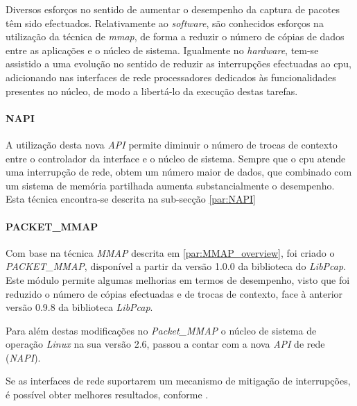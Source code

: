 Diversos esforços no sentido de aumentar o desempenho da captura de pacotes têm sido efectuados.
Relativamente ao \textit{software}, são conhecidos esforços na utilização da técnica de \textit{mmap}, de forma a reduzir o número de cópias de dados entre as aplicações e o núcleo de sistema.
Igualmente no \textit{hardware}, tem-se assistido a uma evolução no sentido de reduzir as interrupções efectuadas ao cpu, adicionando nas interfaces de rede processadores dedicados às funcionalidades presentes no núcleo, de modo a libertá-lo da execução destas tarefas.

\paragraph*{NAPI}

A utilização desta nova \textit{API} permite diminuir o número de trocas de contexto entre o controlador da interface e o núcleo de sistema.
Sempre que o cpu atende uma interrupção de rede, obtem um número maior de dados, que combinado com um sistema de memória partilhada aumenta substancialmente o desempenho.
Esta técnica encontra-se descrita na sub-secção \ref{par:NAPI}

\paragraph*{PACKET\_MMAP}

Com base na técnica \textit{MMAP} descrita em \ref{par:MMAP_overview}, foi criado o \textit{PACKET\_MMAP}, disponível a partir da versão 1.0.0 da biblioteca do \textit{LibPcap}.
Este módulo permite algumas melhorias em termos de desempenho, visto que foi reduzido o número de cópias efectuadas e de trocas de contexto, face à anterior versão 0.9.8 da biblioteca \textit{LibPcap}.

Para além destas modificações no \textit{Packet\_MMAP} o núcleo de sistema de operação \textit{Linux} na sua versão 2.6, passou a contar com a nova \textit{API} de rede (\textit{NAPI}).

Se as interfaces de rede suportarem um mecanismo de mitigação de interrupções, é possível obter melhores resultados, conforme \cite{Deri2004}.

% 

